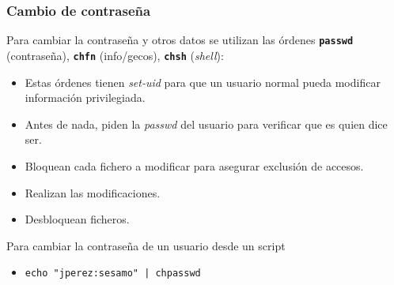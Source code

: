 \documentclass[ucs]{beamer}
\begin{document}
\begin{frame}[fragile]
  \frametitle{Cambio de contraseña}
    Para cambiar la contraseña y otros datos se utilizan las órdenes
      \texttt{\textbf{passwd}} (contraseña), \texttt{\textbf{chfn}} (info/gecos), \texttt{\textbf{chsh}} (\emph{shell}):
      \begin{itemize}
        \item Estas órdenes tienen \emph{set-uid} para que un usuario normal pueda modificar
          información privilegiada.
        \item Antes de nada, piden la \emph{passwd} del usuario para verificar que es quien dice ser.
        \item Bloquean cada fichero a modificar para asegurar exclusión de accesos.
        \item Realizan las modificaciones.
        \item Desbloquean ficheros.
      \end{itemize}

Para cambiar la contraseña de un usuario desde un script

\begin{itemize}
\item
  \begin{scriptsize}
  \begin{verbatim}
echo "jperez:sesamo" | chpasswd
  \end{verbatim}
  \end{scriptsize}
\end{itemize}



\end{frame}
\end{document}
